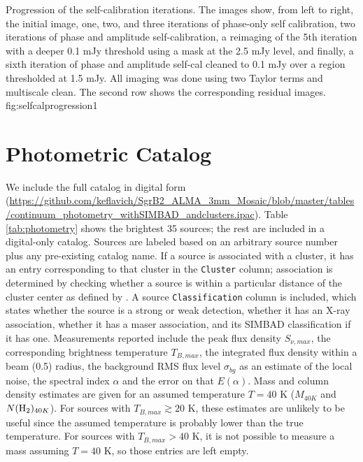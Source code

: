 \documentclass[twocolumn]{aastex61}
\begin{document}
{Progression of the self-calibration iterations.  The images show, from left to
right, the initial image, one, two, and three iterations of phase-only self
calibration, two iterations of phase and amplitude self-calibration,  a
reimaging of the 5th iteration with a deeper 0.1 mJy threshold using a mask at
the 2.5 mJy level, and finally, a sixth iteration of phase and amplitude
self-cal cleaned to 0.1 mJy over a region thresholded at 1.5 mJy.  All imaging
was done using two Taylor terms and multiscale clean.  The second row shows the
corresponding residual images.}
{fig:selfcalprogression}{1}{\textwidth}

\section{Photometric Catalog}
\label{sec:catalog}
We include the full catalog in digital form
(\url{https://github.com/keflavich/SgrB2_ALMA_3mm_Mosaic/blob/master/tables/continuum_photometry_withSIMBAD_andclusters.ipac}).
Table \ref{tab:photometry} shows
the brightest 35 sources; the rest are included in a digital-only catalog.
Sources are labeled based on an arbitrary source
number plus any pre-existing catalog name.  If a source is associated with a cluster,
it has an entry corresponding to that cluster in the \texttt{Cluster} column;
association is determined by checking whether a source is within a particular distance
of the cluster center as defined by \citet{Schmiedeke2016a}.  A source
\texttt{Classification} column is included, which states whether the source
is a strong or weak detection, whether it has an X-ray association, whether it
has a maser association, and its SIMBAD classification if it has one.
Measurements reported include the peak flux density $S_{\nu,max}$, the
corresponding brightness temperature $T_{B,max}$, the integrated flux density
within a beam (0.5\arcsec) radius, the background RMS flux level $\sigma_{bg}$
as an estimate of the local noise, the spectral index $\alpha$ and the error on
that $E(\alpha)$.  Mass and column density estimates are given for an assumed
temperature $T=40$ K ($M_{40K}$ and $N(\textrm{H}_{2})_{40K}$).  For sources with
$T_{B,max}\gtrsim20$ K, these estimates are unlikely to be useful since the
assumed temperature is probably lower than the true temperature.
For sources with $T_{B,max}>40$ K, it is not possible to measure a mass
assuming $T=40$ K, so those entries are left empty.


\end{document}
